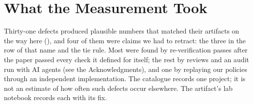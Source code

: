 \section{What the Measurement Took}
\label{sec:lessons}
Thirty-one defects produced plausible numbers that matched their artifacts on the way here
(), and four of them were claims we had to retract: the three in the row of that name
and the tie rule. Most were found by re-verification passes after the
paper passed every check it defined for itself; the rest by reviews and an audit run with AI agents (see the
Acknowledgments), and one by replaying our policies through an independent implementation. The catalogue records one project; it is
not an estimate of how often such defects occur elsewhere. The artifact's lab notebook records each with its fix.

